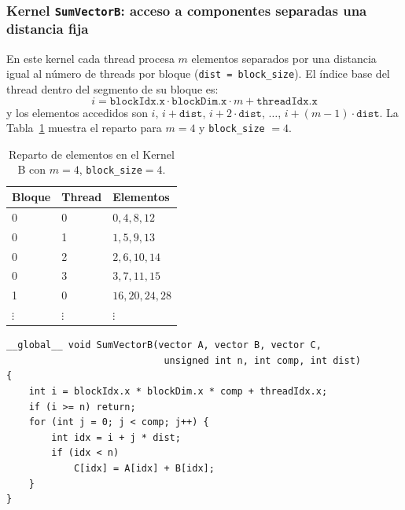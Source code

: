\documentclass[12pt]{article}
\newenvironment{exercise}[2][Ejercicio]{\begin{trivlist}
\item[\hskip \labelsep {\bfseries #1}\hskip \labelsep {\bfseries #2.}]}{\end{trivlist}}
\begin{document}
\begin{exercise}{1}
    \subsubsection*{Kernel \texttt{SumVectorB}: acceso a componentes separadas una distancia fija}

    En este kernel cada thread procesa $m$ elementos separados por una distancia igual al número
    de threads por bloque (\texttt{dist = block\_size}). El índice base del thread dentro del
    segmento de su bloque es:
    \begin{equation}
        i = \texttt{blockIdx.x} \cdot \texttt{blockDim.x} \cdot m + \texttt{threadIdx.x}
    \end{equation}
    y los elementos accedidos son $i,\, i+\texttt{dist},\, i+2\cdot\texttt{dist},\,\ldots,\,
        i+(m-1)\cdot\texttt{dist}$.
    La Tabla~\ref{tab:kernelB} muestra el reparto para $m = 4$ y \texttt{block\_size} $= 4$.

    \begin{table}[h]
        \centering
        \begin{tabular}{lll}
            \hline
            \textbf{Bloque} & \textbf{Thread} & \textbf{Elementos} \\
            \hline
            0               & 0               & $0,4,8,12$         \\
            0               & 1               & $1,5,9,13$         \\
            0               & 2               & $2,6,10,14$        \\
            0               & 3               & $3,7,11,15$        \\
            1               & 0               & $16,20,24,28$      \\
            $\vdots$        & $\vdots$        & $\vdots$           \\
            \hline
        \end{tabular}
        \caption{Reparto de elementos en el Kernel B con $m=4$, \texttt{block\_size}$=4$.}
        \label{tab:kernelB}
    \end{table}

    \begin{lstlisting}[caption={Kernel \texttt{SumVectorB}: acceso con saltos.}, label={lst:SumVectorB}]
__global__ void SumVectorB(vector A, vector B, vector C,
                            unsigned int n, int comp, int dist)
{
    int i = blockIdx.x * blockDim.x * comp + threadIdx.x;
    if (i >= n) return;
    for (int j = 0; j < comp; j++) {
        int idx = i + j * dist;
        if (idx < n)
            C[idx] = A[idx] + B[idx];
    }
}
    \end{lstlisting}


\end{exercise}
\end{document}
